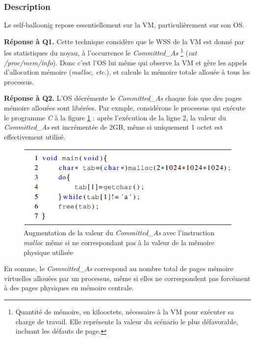 \subsubsection{Description}
Le self-balloonig \cite{online6} repose essentiellement sur la VM, particulièrement sur son \acs{OS}.  
\par{\textbf{Réponse à Q1.}} Cette technique considère que le \acs{WSS} de la VM est donné par les statistiques du noyau, à l'occurrence le \textit{Committed\_As}\cite{online7, online8} \footnote{Quantité de mémoire, en kilooctets, nécessaire à la VM pour exécuter sa charge de travail. Elle représente la valeur du scénario le plus défavorable, incluant les défauts de page.} (\textit{cat /proc/mem/info}). Donc c'est l'OS lui même qui observe la VM et gère les appels d'allocation mémoire (\textit{malloc, etc.}), et calcule la mémoire totale allouée à tous les processus.
\par{\textbf{Réponse à Q2.}} L'OS décrémente le \textit{Committed\_As} chaque fois que des pages mémoire allouées sont libérées. Par exmple, considérons le processus qui exécute le programme \emph{C} à la figure \ref{fig:exempl_prog_c} : après l'exécution de la ligne 2, la valeur du \textit{Committed\_As} est incrémentée de 2GB, même si uniquement 1 octet est effectivement utilisé.\\

\begin{figure}[H]
    \centering
    \includegraphics[scale=.5]{chapters/2/fig2/prog_c}
    \caption{Augmentation de la valeur du \textit{Committed\_As} avec l'instruction \textit{malloc} même si ne correspondant pas à la valeur de la mêmoire physique utilisée}
    \label{fig:exempl_prog_c}
\end{figure}

\noindent En somme, le \textit{Committed\_As} correspond au nombre total de pages mémoire virtuelles allouées par un processus, même si elles ne correspondent pas forcément à des pages physiques en mémoire centrale.

